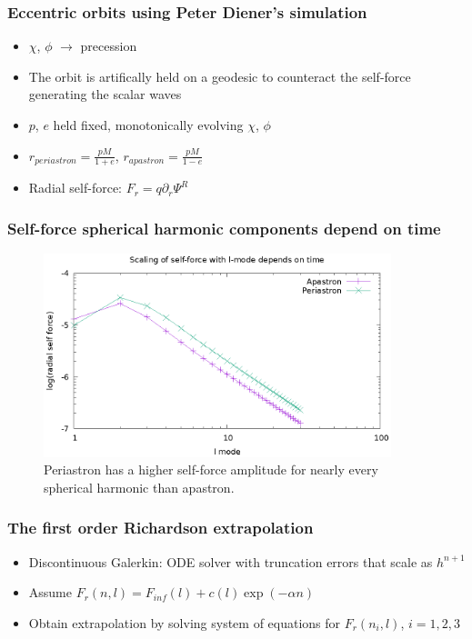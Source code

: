 \documentclass{beamer}
\begin{document}
\begin{frame}
  \frametitle{Eccentric orbits using Peter Diener's simulation}
  \begin{itemize}
  \item $\chi$, $\phi$ $\rightarrow$ precession
  \item The orbit is artifically held on a geodesic to counteract the self-force generating the scalar waves
  \item $p$, $e$ held fixed, monotonically evolving $\chi$, $\phi$
  \item $r_{periastron}=\frac{pM}{1+e}$, $r_{apastron}=\frac{pM}{1-e}$
  \item Radial self-force: $F_r=q\partial_r\Psi^R$
  \end{itemize}
\end{frame}


\begin{frame}
  \frametitle{Self-force spherical harmonic components depend on time}
  \begin{figure}
    \includegraphics[width=0.9\textwidth]{lmodescalingdependsontime}
    \caption{Periastron has a higher self-force amplitude for nearly every spherical harmonic than apastron.}
  \end{figure}
\end{frame}

\begin{frame}
  \frametitle{The first order Richardson extrapolation}
  \begin{itemize}
  \item Discontinuous Galerkin: ODE solver with truncation errors that scale as $h^{n+1}$
  \item Assume $F_r(n,l)=F_{inf}(l)+c(l)\exp(-\alpha n)$
  \item Obtain extrapolation by solving system of equations for $F_r(n_i,l)$, $i=1,2,3$
   \end{itemize}
\end{frame}
\end{document}
